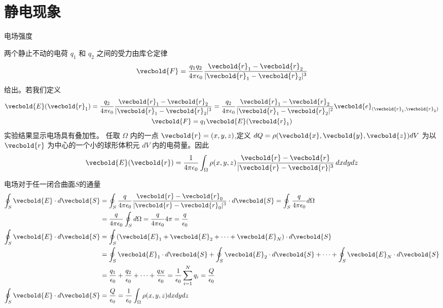 \section{静电现象}
\begin{defn}
    电场强度

    两个静止不动的电荷 \( q_1 \) 和 \( q_2 \) 之间的受力由库仑定律
    \[
    \vecbold{F} = \frac{q_1 q_2}{4 \pi \epsilon_0} \frac{\vecbold{r}_1 - \vecbold{r}_2}{|\vecbold{r}_1 - \vecbold{r}_2|^3}
    \]
给出。若我们定义
\begin{gather*}
        \vecbold{E}(\vecbold{r}_1) = \frac{q_2}{4 \pi \epsilon_0} \frac{\vecbold{r}_1 - \vecbold{r}_2}{|\vecbold{r}_1 - \vecbold{r}_2|^3}
        =\frac{q_2}{4 \pi \epsilon_0} \frac{\vecbold{r}_1 - \vecbold{r}_2}{|\vecbold{r}_1 - \vecbold{r}_2|^2}\vecbold{e}_{(\vecbold{r}_1,\vecbold{r}_2)}\\
        \vecbold{F} = q_1 \vecbold{E}(\vecbold{r}_1)
\end{gather*}
实验结果显示电场具有叠加性。
任取 \(\Omega\) 内的一点 \(\vecbold{r} = (x,y,z)\),定义 \(dQ = \rho(\vecbold{x}, \vecbold{y}, \vecbold{z}) dV\) 
为以 \(\vecbold{r}\) 为中心的一个小的球形体积元 \(dV\) 内的电荷量。因此
\[
\vecbold{E}(\vecbold{r}) = \frac{1}{4\pi\epsilon_0}\int_{\Omega}\rho(x,y,z)\frac{\vecbold{r} - \vecbold{r}}{|\vecbold{r} - \vecbold{r}|^3}\,dxdydz
\]
\end{defn}
\begin{defn}
    电场对于任一闭合曲面\(S\)的通量
\begin{align*}
    \oint_S \vecbold{E} \cdot d\vecbold{S} 
    &= \oint_S \frac{q}{4\pi \epsilon_0} \frac{\vecbold{r} - \vecbold{r}_0}{|\vecbold{r} 
    - \vecbold{r}_0|^3} \cdot d\vecbold{S} 
    = \oint_S \frac{q}{4\pi \epsilon_0} d\Omega\\
    &= \frac{q}{4\pi \epsilon_0} \oint_S d\Omega 
    = \frac{q}{4\pi \epsilon_0} 4\pi = \frac{q}{\epsilon_0}\\
\oint_S \vecbold{E} \cdot d\vecbold{S} 
&= \oint_S (\vecbold{E}_1 + \vecbold{E}_2 + \cdots + \vecbold{E}_N) \cdot d\vecbold{S}\\
&= \oint_S \vecbold{E}_1 \cdot d\vecbold{S} 
+ \oint_S \vecbold{E}_2 \cdot d\vecbold{S} 
+ \cdots + \oint_S \vecbold{E}_N \cdot d\vecbold{S}\\
&= \frac{q_1}{\epsilon_0} + \frac{q_2}{\epsilon_0} 
+ \cdots + \frac{q_N}{\epsilon_0} 
= \frac{1}{\epsilon_0} \sum_{i=1}^N q_i = \frac{Q}{\epsilon_0}\\
\oint_S \vecbold{E} \cdot d\vecbold{S} &= \frac{Q}{\epsilon_0} 
= \frac{1}{\epsilon_0} \int_{\Omega} \rho(x, y, z) dx dy dz
\end{align*}
\end{defn}
